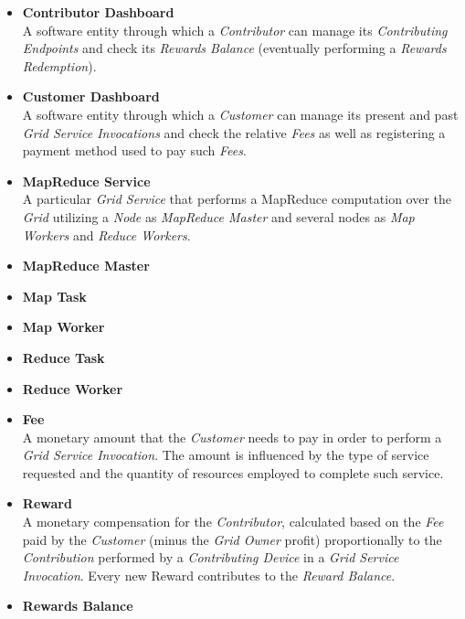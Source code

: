 \begin{itemize}
    \item \textbf{Contributor Dashboard}\label{contributor_dashboard}\\
    A software entity through which a \textit{Contributor} can manage its \textit{Contributing Endpoints} and check its \textit{Rewards Balance} (eventually performing a \textit{Rewards Redemption}).
    \item \textbf{Customer Dashboard}\label{customer_dashboard}\\
    A software entity through which a \textit{Customer} can manage its present and past \textit{Grid Service Invocations} and check the relative \textit{Fees} as well as registering a payment method used to pay such \textit{Fees}.
    \item \textbf{MapReduce Service}\label{mapreduce_service}\\
    A particular \textit{Grid Service} that performs a MapReduce computation over the \textit{Grid} utilizing a \textit{Node} as \textit{MapReduce Master} and several nodes as \textit{Map Workers} and \textit{Reduce Workers}.
    \item \textbf{MapReduce Master}\label{mapreduce_master}\\
    \item \textbf{Map Task}\label{map_task}\\
    \item \textbf{Map Worker}\label{map_worker}\\
    \item \textbf{Reduce Task}\label{reduce_task}\\
    \item \textbf{Reduce Worker}\label{reduce_worker}\\
    \item \textbf{Fee}\label{fee}\\
    A monetary amount that the \textit{Customer} needs to pay in order to perform a \textit{Grid Service Invocation}. The amount is influenced by the type of service requested and the quantity of resources employed to complete such service.
    \item \textbf{Reward}\label{reward}\\
    A monetary compensation for the \textit{Contributor}, calculated based on the \textit{Fee} paid by the \textit{Customer} (minus the \textit{Grid Owner} profit) proportionally to the \textit{Contribution} performed by a \textit{Contributing Device} in a \textit{Grid Service Invocation}. Every new Reward contributes to the \textit{Reward Balance}.
    \item \textbf{Rewards Balance}\label{rewards_balance}\\

\end{itemize}
